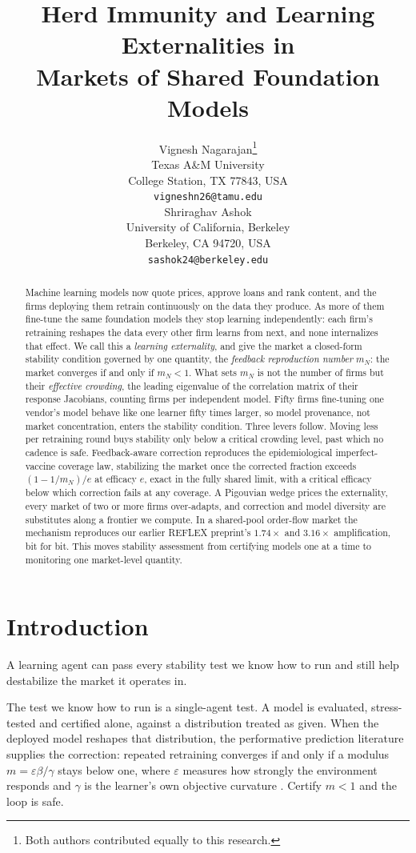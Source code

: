 \documentclass{article}
\title{Herd Immunity and Learning Externalities in\\ Markets of Shared Foundation Models}
\author{%
  Vignesh Nagarajan\thanks{Both authors contributed equally to this research.} \\
  Texas A\&M University \\
  College Station, TX 77843, USA \\
  \texttt{vigneshn26@tamu.edu} \\
  \And
  Shriraghav Ashok\footnotemark[1] \\
  University of California, Berkeley \\
  Berkeley, CA 94720, USA \\
  \texttt{sashok24@berkeley.edu} \\
}
\theoremstyle{plain}
\theoremstyle{definition}
\newcommand{\mN}{m_N}
\begin{document}
\maketitle

\begin{abstract}
Machine learning models now quote prices, approve loans and rank content, and the firms deploying them retrain continuously on the data they produce. As more of them fine-tune the same foundation models they stop learning independently: each firm's retraining reshapes the data every other firm learns from next, and none internalizes that effect. We call this a \emph{learning externality}, and give the market a closed-form stability condition governed by one quantity, the \emph{feedback reproduction number} $\mN$: the market converges if and only if $\mN < 1$. What sets $\mN$ is not the number of firms but their \emph{effective crowding}, the leading eigenvalue of the correlation matrix of their response Jacobians, counting firms per independent model. Fifty firms fine-tuning one vendor's model behave like one learner fifty times larger, so model provenance, not market concentration, enters the stability condition. Three levers follow. Moving less per retraining round buys stability only below a critical crowding level, past which no cadence is safe. Feedback-aware correction reproduces the epidemiological imperfect-vaccine coverage law, stabilizing the market once the corrected fraction exceeds $(1-1/\mN)/e$ at efficacy $e$, exact in the fully shared limit, with a critical efficacy below which correction fails at any coverage. A Pigouvian wedge prices the externality, every market of two or more firms over-adapts, and correction and model diversity are substitutes along a frontier we compute. In a shared-pool order-flow market the mechanism reproduces our earlier REFLEX preprint's $1.74\times$ and $3.16\times$ amplification, bit for bit. This moves stability assessment from certifying models one at a time to monitoring one market-level quantity.
\end{abstract}

\section{Introduction}

A learning agent can pass every stability test we know how to run and still help destabilize the market it operates in.

The test we know how to run is a single-agent test. A model is evaluated, stress-tested and certified alone, against a distribution treated as given. When the deployed model reshapes that distribution, the performative prediction literature supplies the correction: repeated retraining converges if and only if a modulus $m = \varepsilon\beta/\gamma$ stays below one, where $\varepsilon$ measures how strongly the environment responds and $\gamma$ is the learner's own objective curvature \citep{perdomo2020}. Certify $m<1$ and the loop is safe.
\end{document}

